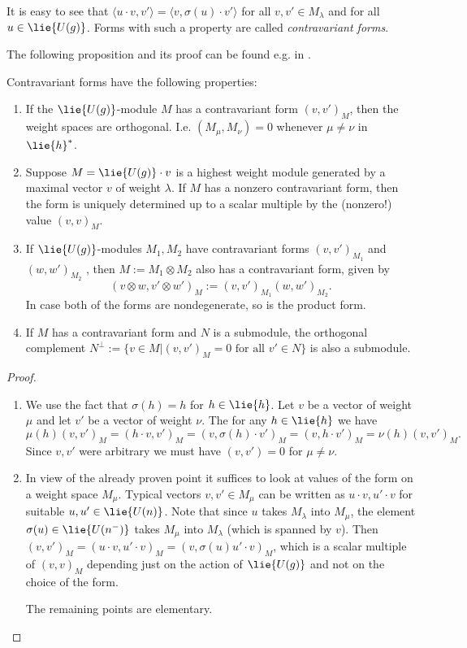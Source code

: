 It is easy to see that $\langle u\cdot v,v' \rangle = \langle v,\sigma(u)\cdot v' \rangle$ for all $v,v'\in M_\lambda$ and for all $u\in \lie{U(g)}$. Forms with such a property are called \emph{contravariant forms}.

The following proposition and its proof can be found e.g. in \cite{humphreys_representations_2008}.

\begin{proposition}
Contravariant forms have the following properties:
\begin{enumerate}
 \item If the $\lie{U(g)}$-module $M$ has a contravariant form $(v,v')_M$, then the weight spaces are orthogonal. I.e. $( M_\mu,M_\nu)=0$ whenever $\mu\neq\nu$ in $\lie{h}^*$.
 \item Suppose $M = \lie{U(g)} \cdot v$ is a highest weight module generated by a maximal vector $v$ of weight $\lambda$. If $M$ has a nonzero contravariant form, then the form is uniquely determined up to a scalar multiple by the (nonzero!) value $( v, v)_M$.
 \item  If $\lie{U(g)}$-modules $M_1, M_2$ have contravariant forms $(v, v')_{M_1}$ and $(w,w')_{M_2}$ , then $M := M_1\otimes M_2$ also has a contravariant form, given by \[(v\otimes w, v'\otimes w')_M := (v, v')_{M_1} (w,w')_{M_2}.\] In case both of the forms are nondegenerate, so is the product form.
 \item If $M$ has a contravariant form and $N$ is a submodule, the orthogonal complement $N^\perp := \{v\in M | (v, v')_M = 0 \text{ for all } v' \in N \}$ is also a submodule.
\end{enumerate}
\end{proposition}
\begin{proof}
\begin{enumerate}
 \item We use the fact that $\sigma(h) = h$ for $h\in\lie{h}$. Let $v$ be a vector of weight $\mu$ and let $v'$ be a vector of weight $\nu$. The for any $h\in\lie{h}$ we have
 \[
  \mu(h)(v,v')_M = (h\cdot v,v')_M = (v,\sigma(h)\cdot v')_M = (v,h\cdot v')_M = \nu(h)(v,v')_M.
 \]
 Since $v,v'$ were arbitrary we must have $(v,v')=0$ for $\mu\neq \nu$.
 \item In view of the already proven point it suffices to look at values of the form on a weight
space $M_\mu$. Typical vectors $v, v' \in M_\mu$ can be written as $u\cdot v, u'\cdot v$ for suitable $u, u'\in\lie{U(n)}$. Note that since $u$ takes $M_\lambda$ into $M_\mu$, the element $\sigma(u) \in \lie{U(n^-)}$ takes $M_\mu$ into $M_\lambda$ (which is spanned by $v$). Then $(v, v')_M = (u\cdot v, u'\cdot v)_M = (v, \sigma(u)u'\cdot v)_M$, which is a scalar multiple of $(v, v)_M$ depending just on the action of $\lie{U(g)}$ and not on the choice of the form.

The remaining points are elementary.
\end{enumerate}
\end{proof}

